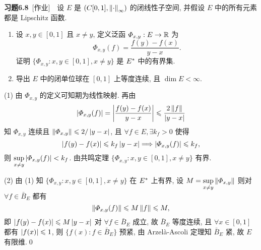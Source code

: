     \textbf{习题6.8}\ [作业]\ \ 设 $ E $ 是 $ (C[0, 1], \left\| \cdot \right\|_{\infty}) $ 的闭线性子空间, 并假设 $ E $ 中的所有元素都是 Lipschitz 函数.
    \begin{enumerate}[(1)]
        \item 设 $ x, y\in[0, 1] $ 且 $ x\ne y $, 定义泛函 $ \varPhi_{x, y}:E\to\mathbb{R} $ 为
        \[
            \varPhi_{x, y}(f)=\frac{f(y)-f(x)}{y-x}.
        \]
        证明 $\{ \varPhi_{x, y}:x, y\in[0, 1], x\ne y \}$ 是 $ E^{*} $ 中的有界集.
        \item 导出 $ E $ 中的闭单位球在 $ [0, 1] $ 上等度连续, 且 $ \dim E<\infty $.
    \end{enumerate}
    \begin{Proof}
        (1) 由 $ \varPhi_{x, y} $ 的定义可知期为线性映射. 再由
        \[
            \left| \varPhi_{x, y}(f) \right| =\left| \frac{f(y)-f(x)}{y-x} \right| \leqslant\frac{2\left\| f \right\|}{\left| y-x \right| }
        \]
        知 $ \varPhi_{x, y} $ 连续且 $ \left\| \varPhi_{x, y} \right\|\leqslant2/\left| y-x \right|  $, 且 $ \forall f\in E, \exists k_{f}>0 $ 使得
        \[
            \left| f(y)-f(x) \right| \leqslant k_{f}\left| y-x \right| \Longrightarrow \left| \varPhi_{x, y}(f) \right| \leqslant k_{f},
        \]
        则 $\sup\limits_{x\ne y}\left| \varPhi_{x, y}(f) \right| <k_{f} $. 由共鸣定理 $\{ \varPhi_{x, y}:x, y\in[0, 1], x\ne y \}$ 有界.

        (2) 由 (1) 知 $\{ \varPhi_{x, y}:x, y\in[0, 1], x\ne y \}$ 在 $ E^{*} $ 上有界, 设 $ M=\sup\limits_{x\ne y}\left\| \varPhi_{x, y} \right\| $ 则对 $ \forall f\in\bar{B}_{E} $ 都有
        \[
            \left\| \varPhi_{x, y}(f) \right\|\leqslant M\left\| f \right\|\leqslant M,
        \]
        即 $ \left| f(y)-f(x) \right| \leqslant M\left| y-x \right|  $ 对 $ \forall f\in\bar{B}_{E} $ 成立, 故 $ \bar{B}_{E} $ 等度连续, 且 $ \forall x\in[0, 1] $ 都有 $ \left| f(x) \right| \leqslant 1 $, 则 $ \{ f(x):f\in\bar{B}_{E} \} $ 预紧, 由 Arzel\`a-Ascoli 定理知 $ \bar{B}_{E} $ 紧, 故 $ E $ 有限维.\qed
    \end{Proof}

